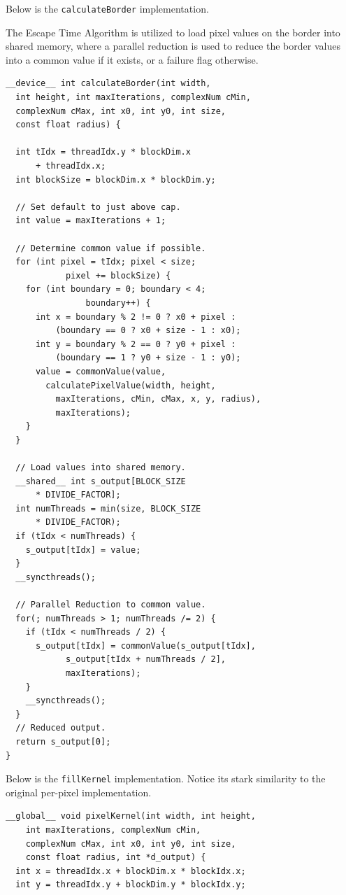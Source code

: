 \documentclass[letterpaper]{article}
\begin{document}
\begin{multicols}{2}
Below is the \texttt{calculateBorder} implementation. 

The Escape Time Algorithm is utilized to load pixel values on the border into
  shared memory, where a parallel reduction is used to reduce the border values
  into a common value if it exists, or a failure flag otherwise. \\ 

\begin{lstlisting}
__device__ int calculateBorder(int width, 
  int height, int maxIterations, complexNum cMin, 
  complexNum cMax, int x0, int y0, int size, 
  const float radius) {

  int tIdx = threadIdx.y * blockDim.x 
      + threadIdx.x;
  int blockSize = blockDim.x * blockDim.y;

  // Set default to just above cap.
  int value = maxIterations + 1;

  // Determine common value if possible.
  for (int pixel = tIdx; pixel < size; 
			pixel += blockSize) {
    for (int boundary = 0; boundary < 4; 
				boundary++) {
      int x = boundary % 2 != 0 ? x0 + pixel : 
          (boundary == 0 ? x0 + size - 1 : x0); 
      int y = boundary % 2 == 0 ? y0 + pixel : 
          (boundary == 1 ? y0 + size - 1 : y0);
      value = commonValue(value, 
        calculatePixelValue(width, height, 
          maxIterations, cMin, cMax, x, y, radius), 
          maxIterations);
    }
  }

  // Load values into shared memory.
  __shared__ int s_output[BLOCK_SIZE 
      * DIVIDE_FACTOR];
  int numThreads = min(size, BLOCK_SIZE 
      * DIVIDE_FACTOR);
  if (tIdx < numThreads) {
    s_output[tIdx] = value;
  }
  __syncthreads();

  // Parallel Reduction to common value.
  for(; numThreads > 1; numThreads /= 2) {
    if (tIdx < numThreads / 2) {
      s_output[tIdx] = commonValue(s_output[tIdx], 
            s_output[tIdx + numThreads / 2], 
            maxIterations);
    }
    __syncthreads();
  }
  // Reduced output.
  return s_output[0];
}
\end{lstlisting}

Below is the \texttt{fillKernel} implementation. 
Notice its stark similarity to the original per-pixel implementation.

\begin{lstlisting}
__global__ void pixelKernel(int width, int height, 
    int maxIterations, complexNum cMin, 
    complexNum cMax, int x0, int y0, int size, 
    const float radius, int *d_output) {
  int x = threadIdx.x + blockDim.x * blockIdx.x;
  int y = threadIdx.y + blockDim.y * blockIdx.y;


\end{lstlisting}
\end{multicols}
\end{document}
